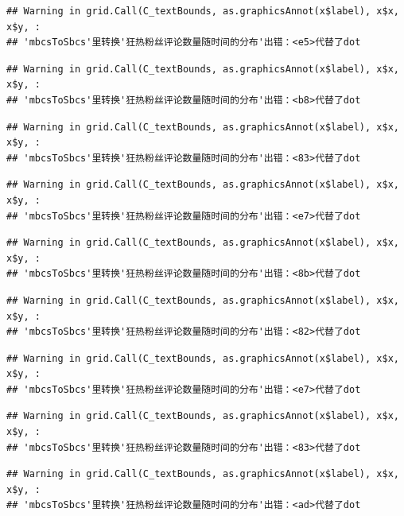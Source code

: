 \documentclass[
]{article}
\begin{document}
\begin{verbatim}
## Warning in grid.Call(C_textBounds, as.graphicsAnnot(x$label), x$x, x$y, :
## 'mbcsToSbcs'里转换'狂热粉丝评论数量随时间的分布'出错：<e5>代替了dot
\end{verbatim}

\begin{verbatim}
## Warning in grid.Call(C_textBounds, as.graphicsAnnot(x$label), x$x, x$y, :
## 'mbcsToSbcs'里转换'狂热粉丝评论数量随时间的分布'出错：<b8>代替了dot
\end{verbatim}

\begin{verbatim}
## Warning in grid.Call(C_textBounds, as.graphicsAnnot(x$label), x$x, x$y, :
## 'mbcsToSbcs'里转换'狂热粉丝评论数量随时间的分布'出错：<83>代替了dot
\end{verbatim}

\begin{verbatim}
## Warning in grid.Call(C_textBounds, as.graphicsAnnot(x$label), x$x, x$y, :
## 'mbcsToSbcs'里转换'狂热粉丝评论数量随时间的分布'出错：<e7>代替了dot
\end{verbatim}

\begin{verbatim}
## Warning in grid.Call(C_textBounds, as.graphicsAnnot(x$label), x$x, x$y, :
## 'mbcsToSbcs'里转换'狂热粉丝评论数量随时间的分布'出错：<8b>代替了dot
\end{verbatim}

\begin{verbatim}
## Warning in grid.Call(C_textBounds, as.graphicsAnnot(x$label), x$x, x$y, :
## 'mbcsToSbcs'里转换'狂热粉丝评论数量随时间的分布'出错：<82>代替了dot
\end{verbatim}

\begin{verbatim}
## Warning in grid.Call(C_textBounds, as.graphicsAnnot(x$label), x$x, x$y, :
## 'mbcsToSbcs'里转换'狂热粉丝评论数量随时间的分布'出错：<e7>代替了dot
\end{verbatim}

\begin{verbatim}
## Warning in grid.Call(C_textBounds, as.graphicsAnnot(x$label), x$x, x$y, :
## 'mbcsToSbcs'里转换'狂热粉丝评论数量随时间的分布'出错：<83>代替了dot
\end{verbatim}

\begin{verbatim}
## Warning in grid.Call(C_textBounds, as.graphicsAnnot(x$label), x$x, x$y, :
## 'mbcsToSbcs'里转换'狂热粉丝评论数量随时间的分布'出错：<ad>代替了dot
\end{verbatim}
\end{document}
